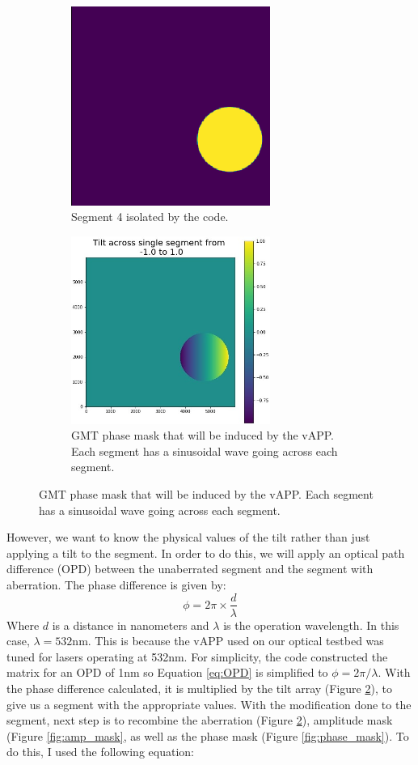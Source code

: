 \begin{figure}[H]
\centering
\begin{subfigure}{.5\textwidth}
  \centering
  \includegraphics[width=6.5cm]{Figures/isolated_seg.png}
  \caption{Segment 4 isolated by the code.}
  \label{fig:single_seg}
\end{subfigure}%
\begin{subfigure}{.5\textwidth}
  \centering
  \includegraphics[width=6.5cm]{Figures/tip_single_seg.jpg}
  \caption{GMT phase mask that will be induced by the vAPP.  Each segment has a sinusoidal wave going across each segment.}
  \label{fig:tilt_seg}
\end{subfigure}
\label{fig:isolated_seg}
\end{figure}

However, we want to know the physical values of the tilt rather than just applying a tilt to the segment.  In order to do this, we will apply an optical path difference (OPD) between the unaberrated segment and the segment with aberration.  The phase difference is given by:
\begin{equation}
    \phi = 2 \pi \times \frac{d}{\lambda}
    \label{eq:OPD}
\end{equation}
Where $d$ is a distance in nanometers and $\lambda$ is the operation wavelength.  In this case, $\lambda = 532$nm.  This is because the vAPP used on our optical testbed was tuned for lasers operating at 532nm.  For simplicity, the code constructed the matrix for an OPD of 1nm so Equation \ref{eq:OPD} is simplified to $\phi = 2 \pi / \lambda$.  With the phase difference calculated, it is multiplied by the tilt array (Figure \ref{fig:tilt_seg}), to give us a segment with the appropriate values.  With the modification done to the segment, next step is to recombine the aberration (Figure \ref{fig:tilt_seg}), amplitude mask (Figure \ref{fig:amp_mask}, as well as the phase mask (Figure \ref{fig:phase_mask}).  To do this, I used the following equation:

